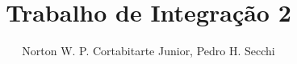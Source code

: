 \documentclass[12pt]{article}
\title{Trabalho de Integração 2}
\author{Norton W. P. Cortabitarte Junior\inst{1},  Pedro H. Secchi\inst{1}}
\begin{document}
 
	
	\maketitle
	
	
	
	\nocite{*}
	
	
	
\end{document}
